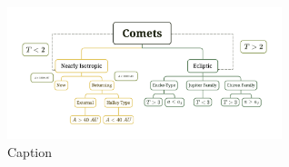 \begin{figure}
    \centering
    \includegraphics[width=8cm]{Comets.png}
    \caption{Caption}
    \label{fig:enter-label}
\end{figure}